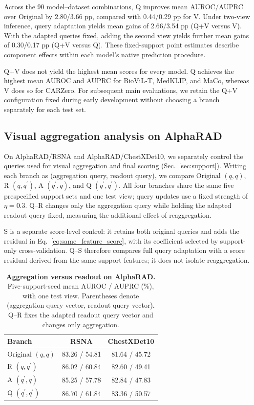 \documentclass[10pt,twocolumn,letterpaper]{article}
\begin{document}


Across the 90 model--dataset combinations, Q improves mean AUROC/AUPRC over Original by 2.80/3.66 pp, compared with 0.44/0.29 pp for V. Under two-view inference, query adaptation yields mean gains of 2.66/3.54 pp (Q+V versus V). With the adapted queries fixed, adding the second view yields further mean gains of 0.30/0.17 pp (Q+V versus Q). These fixed-support point estimates describe component effects within each model's native prediction procedure.

Q+V does not yield the highest mean scores for every model. Q achieves the highest mean AUROC and AUPRC for BioViL-T, MedKLIP, and MaCo, whereas V does so for CARZero. For subsequent main evaluations, we retain the Q+V configuration fixed during early development without choosing a branch separately for each test set.

\subsection{Visual aggregation analysis on AlphaRAD}
\label{sec:paths}
On AlphaRAD/RSNA and AlphaRAD/ChestXDet10, we separately control the queries used for visual aggregation and final scoring (Sec.~\ref{sec:support}). Writing each branch as (aggregation query, readout query), we compare Original $(q,q)$, R $(q,q^{\prime})$, A $(q^{\prime},q)$, and Q $(q^{\prime},q^{\prime})$. All four branches share the same five prespecified support sets and one test view; query updates use a fixed strength of $\eta=0.3$. Q--R changes only the aggregation query while holding the adapted readout query fixed, measuring the additional effect of reaggregation.

S is a separate score-level control: it retains both original queries and adds the residual in Eq.~\ref{eq:same_feature_score}, with its coefficient selected by support-only cross-validation. Q--S therefore compares full query adaptation with a score residual derived from the same support features; it does not isolate reaggregation.

\begin{table}[t]
\centering
\caption{\textbf{Aggregation versus readout on AlphaRAD.} Five-support-seed mean AUROC / AUPRC (\%), with one test view. Parentheses denote (aggregation query vector, readout query vector). Q--R fixes the adapted readout query vector and changes only aggregation.}
\label{tab:paths}
\small
\begin{tabular}{@{}lcc@{}}
\toprule
Branch & RSNA & ChestXDet10 \\
\midrule
Original $(q,q)$ & 83.26 / 54.81 & 81.64 / 45.72 \\
R $(q,q^{\prime})$ & 86.02 / 60.84 & 82.60 / 49.41 \\
A $(q^{\prime},q)$ & 85.25 / 57.78 & 82.84 / 47.83 \\
Q $(q^{\prime},q^{\prime})$ & 86.70 / 61.84 & 83.36 / 50.57 \\
\bottomrule
\end{tabular}
\end{table}
\end{document}
